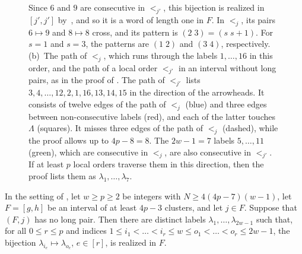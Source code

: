 \documentclass[fontsize=12pt,leading=14pt]{fullpaper}
\begin{document}
\begin{figure}[ht]
{    Since $6$ and $9$ are consecutive in $<_{j'}$, this bijection is realized in $[j',j']$ by~, and so it is a word of length one in $F$.
    In $<_j$, its pairs $6\mapsto9$ and $8\mapsto8$ cross, and its pattern is $(2\;3)=(s\;s{+}1)$.
    For $s=1$ and $s=3$, the patterns are $(1\;2)$ and $(3\;4)$, respectively.
    (b)~The path of $<_j$, which runs through the labels $1,\dots,16$ in this order, and the path of a local order $<_{j'}$ in an interval without long pairs, as in the proof of .
    The path of $<_{j'}$ lists $3,4,\dots,12,2,1,16,13,14,15$ in the direction of the arrowheads.
    It consists of twelve edges of the path of $<_j$ (blue) and three edges between non-consecutive labels (red), and each of the latter touches $\Lambda$ (squares).
    It misses three edges of the path of $<_j$ (dashed), while the proof allows up to $4p-8=8$.
    The $2w-1=7$ labels $5,\dots,11$ (green), which are consecutive in $<_j$, are also consecutive in $<_{j'}$.
  If at least $p$ local orders traverse them in this direction, then the proof lists them as $\lambda_1,\dots,\lambda_7$.}
  \label{fig:s3-window}
\end{figure}

\begin{lemma}\label{lem:s3-window}
  In the setting of , let $w\ge p\ge2$ be integers with $N\ge4(4p-7)(w-1)$, let $F=[g,h]$ be an interval of at least $4p-3$ clusters, and let $j\in F$.
  Suppose that $(F,j)$ has no long pair.
  Then there are distinct labels $\lambda_1,\dots,\lambda_{2w-1}$ such that, for all $0\le r\le p$ and indices $1\le i_1<\dots<i_r\le w\le o_1<\dots<o_r\le2w-1$, the bijection $\lambda_{i_e}\mapsto\lambda_{o_e}$, $e\in[r]$, is realized in $F$.
\end{lemma}
\end{document}
